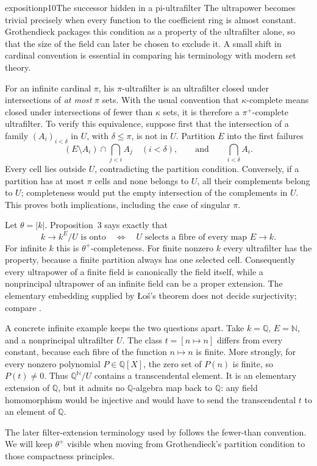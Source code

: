 \begin{dcomment}{exposition}{p10}{The successor hidden in a pi-ultrafilter}
The ultrapower becomes trivial precisely when every function to the coefficient ring is almost constant. Grothendieck packages this condition as a property of the ultrafilter alone, so that the size of the field can later be chosen to exclude it. A small shift in cardinal convention is essential in comparing his terminology with modern set theory.

For an infinite cardinal $\pi$, his $\pi$-ultrafilter is an ultrafilter closed under intersections of \emph{at most} $\pi$ sets. With the usual convention that $\kappa$-complete means closed under intersections of fewer than $\kappa$ sets, it is therefore a $\pi^+$-complete ultrafilter. To verify this equivalence, suppose first that the intersection of a family $(A_i)_{i<\delta}$ in $U$, with $\delta\le\pi$, is not in $U$. Partition $E$ into the first failures
\[
 (E\setminus A_i)\cap\bigcap_{j<i}A_j
 \quad(i<\delta),
 \qquad\text{and}\qquad \bigcap_{i<\delta}A_i.
\]
Every cell lies outside $U$, contradicting the partition condition. Conversely, if a partition has at most $\pi$ cells and none belongs to $U$, all their complements belong to $U$; completeness would put the empty intersection of the complements in $U$. This proves both implications, including the case of singular $\pi$.

Let $\theta=|k|$. Proposition~3 says exactly that
\[
 k\longrightarrow k^E/U\text{ is onto}
 \quad\Longleftrightarrow\quad
 U\text{ selects a fibre of every map }E\longrightarrow k.
\]
For infinite $k$ this is $\theta^+$-completeness. For finite nonzero $k$ every ultrafilter has the property, because a finite partition always has one selected cell. Consequently every ultrapower of a finite field is canonically the field itself, while a nonprincipal ultrapower of an infinite field can be a proper extension. The elementary embedding supplied by \L o\'s's theorem does not decide surjectivity; compare \citet[Corollary~3.3]{Keisler2010Ultraproduct}.

A concrete infinite example keeps the two questions apart. Take $k=\mathbb Q$, $E=\mathbb N$, and a nonprincipal ultrafilter $U$. The class $t=[n\mapsto n]$ differs from every constant, because each fibre of the function $n\mapsto n$ is finite. More strongly, for every nonzero polynomial $P\in\mathbb Q[X]$, the zero set of $P(n)$ is finite, so $P(t)\ne0$. Thus $\mathbb Q^\mathbb N/U$ contains a transcendental element. It is an elementary extension of $\mathbb Q$, but it admits no $\mathbb Q$-algebra map back to $\mathbb Q$: any field homomorphism would be injective and would have to send the transcendental $t$ to an element of $\mathbb Q$.

The later filter-extension terminology used by \citet[Definition~2.3]{BrookeTaylorRosicky2017} follows the fewer-than convention. We will keep $\theta^+$ visible when moving from Grothendieck's partition condition to those compactness principles.
\end{dcomment}

